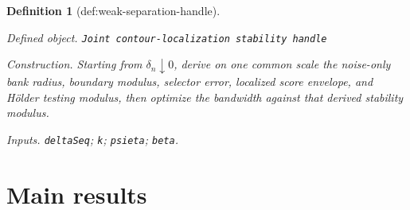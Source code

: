 \documentclass{article}
\newtheorem{definition}{Definition}
\begin{document}
\begin{definition}[def:weak-separation-handle]\label{def:weak-separation-handle}
\par\smallskip\noindent\emph{Defined object.} \texttt{Joint contour-\allowbreak{}localization stability handle}
\par\smallskip\noindent\emph{Construction.} Starting from \(\delta_n\downarrow0\), derive on one common scale the noise-only bank radius, boundary modulus, selector error, localized score envelope, and Hölder testing modulus, then optimize the bandwidth against that derived stability modulus.
\par\smallskip\noindent\emph{Inputs.} \texttt{deltaSeq}; \texttt{k}; \texttt{psieta}; \texttt{beta}.
\end{definition}

\section{Main results}
\end{document}
